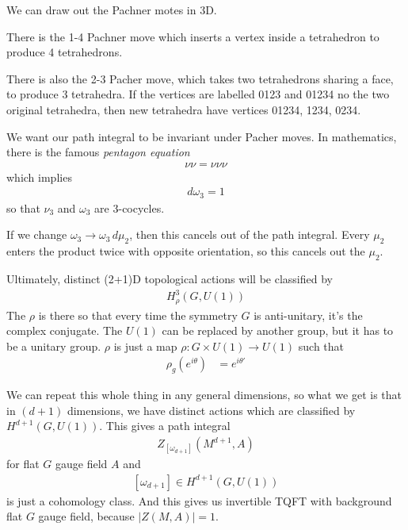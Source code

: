 We can draw out the Pachner motes in 3D.

There is the 1-4 Pachner move which inserts a vertex inside a tetrahedron to
produce 4 tetrahedrons.

There is also the 2-3 Pacher move,
which takes two tetrahedrons sharing a face,
to produce 3 tetrahedra.
If the vertices are labelled 0123 and 01234
no the two original tetrahedra,
then new tetrahedra have vertices
01234, 1234, 0234.

We want our path integral to be invariant under Pacher moves.
In mathematics,
there is the famous \emph{pentagon equation}
\begin{align}
    \nu \nu = \nu\nu\nu
\end{align}
which implies
\begin{align}
    d\omega_3 = 1
\end{align}
so that
$\nu_3$ and $\omega_3$ are 3-cocycles.

If we change
$\omega_3 \to \omega_3\, d\mu_2$,
then this cancels out of the path integral.
Every $\mu_2$ enters the product twice with opposite orientation,
so this cancels out the $\mu_2$.

Ultimately,
distinct (2+1)D topological actions will be classified by
\begin{align}
    H_\rho^3\left( G, U(1) \right)
\end{align}
The $\rho$ is there so that every time the symmetry $G$ is anti-unitary,
it's the complex conjugate.
The $U(1)$ can be replaced by another group,
but it has to be a unitary group.
$\rho$ is just a map $\rho: G\times U(1)\to U(1)$ such that
\begin{align}
    \rho_g\left( e^{i\theta} \right)
    &=
    e^{i\theta'}
\end{align}

We can repeat this whole thing in any general dimensions,
so what we get is that in $(d+1)$ dimensions,
we have distinct actions which are classified by
$H^{d+1}\left( G, U(1) \right)$.
This gives a path integral
\begin{align}
    Z_{\left[ \omega_{d+1} \right]}
    \left( 
    M^{d+1},
    A
    \right)
\end{align}
for flat $G$ gauge field $A$
and
\begin{align}
    \left[ \omega_{d+1} \right]
    \in H^{d+1}\left( G, U(1) \right)
\end{align}
is just a cohomology class.
And this gives us invertible TQFT with background flat $G$ gauge field,
because $|Z(M,A)|=1$.

